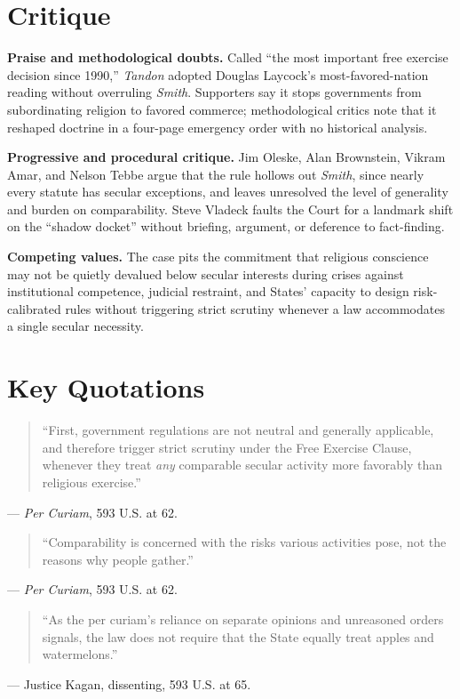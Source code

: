 \documentclass[12pt]{article}
\begin{document}
\section{Critique}

\textbf{Praise and methodological doubts.} Called ``the most important free exercise decision since 1990,'' \textit{Tandon} adopted Douglas Laycock's most-favored-nation reading without overruling \textit{Smith}. Supporters say it stops governments from subordinating religion to favored commerce; methodological critics note that it reshaped doctrine in a four-page emergency order with no historical analysis.

\textbf{Progressive and procedural critique.} Jim Oleske, Alan Brownstein, Vikram Amar, and Nelson Tebbe argue that the rule hollows out \textit{Smith}, since nearly every statute has secular exceptions, and leaves unresolved the level of generality and burden on comparability. Steve Vladeck faults the Court for a landmark shift on the ``shadow docket'' without briefing, argument, or deference to fact-finding.

\textbf{Competing values.} The case pits the commitment that religious conscience may not be quietly devalued below secular interests during crises against institutional competence, judicial restraint, and States' capacity to design risk-calibrated rules without triggering strict scrutiny whenever a law accommodates a single secular necessity.

\section{Key Quotations}

\begin{quote}
``First, government regulations are not neutral and generally applicable, and therefore trigger strict scrutiny under the Free Exercise Clause, whenever they treat \textit{any} comparable secular activity more favorably than religious exercise.''
\end{quote}
\noindent --- \textit{Per Curiam}, 593 U.S. at 62.

\begin{quote}
``Comparability is concerned with the risks various activities pose, not the reasons why people gather.''
\end{quote}
\noindent --- \textit{Per Curiam}, 593 U.S. at 62.

\begin{quote}
``As the per curiam's reliance on separate opinions and unreasoned orders signals, the law does not require that the State equally treat apples and watermelons.''
\end{quote}
\noindent --- Justice Kagan, dissenting, 593 U.S. at 65.
\end{document}
